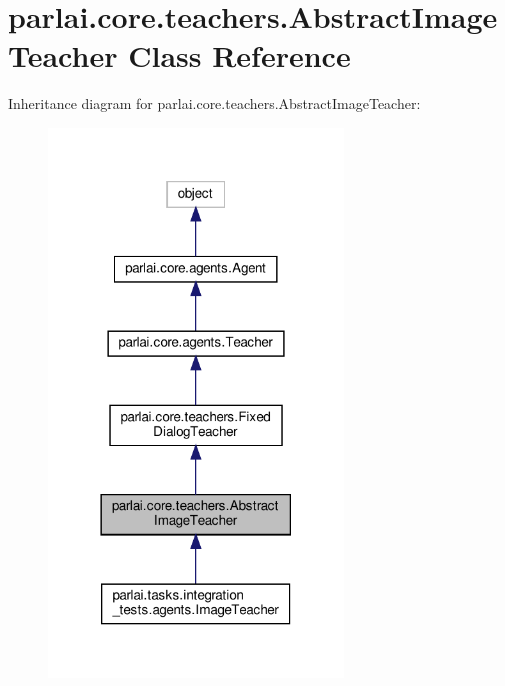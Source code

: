 \hypertarget{classparlai_1_1core_1_1teachers_1_1AbstractImageTeacher}{}\section{parlai.\+core.\+teachers.\+Abstract\+Image\+Teacher Class Reference}
\label{classparlai_1_1core_1_1teachers_1_1AbstractImageTeacher}


Inheritance diagram for parlai.\+core.\+teachers.\+Abstract\+Image\+Teacher\+:
\nopagebreak
\begin{figure}[H]
\begin{center}
\leavevmode
\includegraphics[width=222pt]{da/dee/classparlai_1_1core_1_1teachers_1_1AbstractImageTeacher__inherit__graph}
\end{center}
\end{figure}



